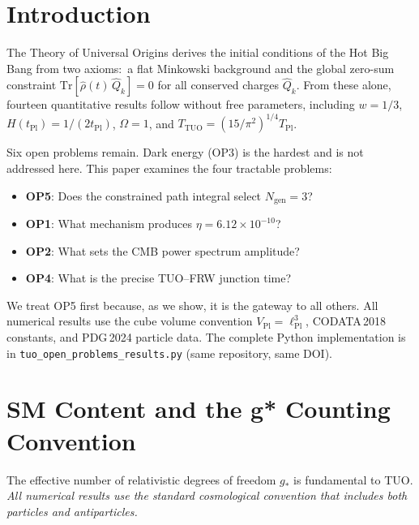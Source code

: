 \documentclass[12pt,a4paper]{article}
\theoremstyle{definition}
\newcommand{\tPl}{t_{\mathrm{Pl}}}
\newcommand{\lPl}{\ell_{\mathrm{Pl}}}
\newcommand{\gstar}{g_{*}}
\newcommand{\Ngen}{N_{\mathrm{gen}}}
\newcommand{\VPl}{V_{\mathrm{Pl}}}
\begin{document}
\tableofcontents
\newpage

\section{Introduction}

The Theory of Universal Origins derives the initial conditions of the Hot Big
Bang from two axioms:\ a flat Minkowski background and the global zero-sum
constraint $\mathrm{Tr}[\hat\rho(t)\,\hat Q_k] = 0$ for all conserved charges
$\hat Q_k$. From these alone, fourteen quantitative results follow without free
parameters, including $w = 1/3$, $H(t_{\mathrm{Pl}}) = 1/(2\tPl)$, $\Omega = 1$,
and $T_{\mathrm{TUO}} = (15/\pi^2)^{1/4} T_{\mathrm{Pl}}$.

Six open problems remain. Dark energy (OP3) is the hardest and is not
addressed here. This paper examines the four tractable problems:

\begin{itemize}[leftmargin=2em]
\item \textbf{OP5}: Does the constrained path integral select $\Ngen = 3$?
\item \textbf{OP1}: What mechanism produces $\eta = 6.12\times10^{-10}$?
\item \textbf{OP2}: What sets the CMB power spectrum amplitude?
\item \textbf{OP4}: What is the precise TUO--FRW junction time?
\end{itemize}

We treat OP5 first because, as we show, it is the gateway to all others.
All numerical results use the cube volume convention $\VPl = \lPl^3$,
CODATA\,2018 constants, and PDG\,2024 particle data.
The complete Python implementation is in \texttt{tuo\_open\_problems\_results.py}
(same repository, same DOI).

\section{SM Content and the g* Counting Convention}
\label{sec:gstar}

The effective number of relativistic degrees of freedom $\gstar$ is fundamental
to TUO. \emph{All numerical results use the standard cosmological convention
that includes both particles and antiparticles.}
\end{document}
